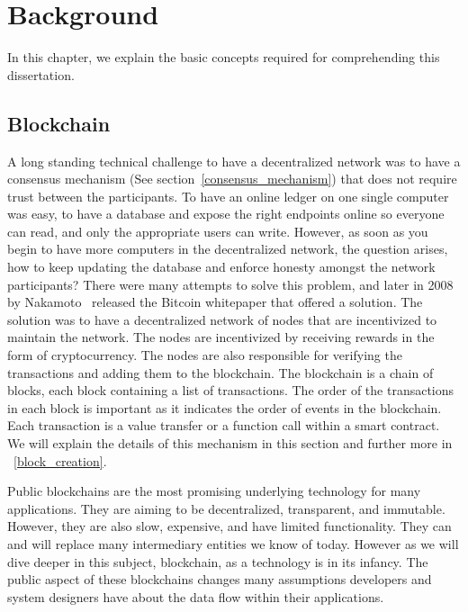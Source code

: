 


\chapter{Background} \label{sec:background}


In this chapter, we explain the basic concepts required for comprehending this dissertation.



\section{Blockchain}
A long standing technical challenge to have a decentralized network was to have a consensus mechanism (See section~\ref{consensus_mechanism}) that does not require trust between the participants. To have an online ledger on one single computer was easy, to have a database and expose the right endpoints online so everyone can read, and only the appropriate users can write. However, as soon as you begin to have more computers in the decentralized network, the question arises, how to keep updating the database and enforce honesty amongst the network participants? There were many attempts to solve this problem, and later in 2008 by Nakamoto~\cite{nakamoto2008bitcoin} released the Bitcoin whitepaper that offered a solution. The solution was to have a decentralized network of nodes that are incentivized to maintain the network. The nodes are incentivized by receiving rewards in the form of cryptocurrency. The nodes are also responsible for verifying the transactions and adding them to the blockchain. The blockchain is a chain of blocks, each block containing a list of transactions. The order of the transactions in each block is important as it indicates the order of events in the blockchain. Each transaction is a value transfer or a function call within a smart contract. We will explain the details of this mechanism in this section and further more in ~\ref{block_creation}.

Public blockchains are the most promising underlying technology for many applications. They are aiming to be decentralized, transparent, and immutable. However, they are also slow, expensive, and have limited functionality. They can and will replace many intermediary entities we know of today. However as we will dive deeper in this subject, blockchain, as a technology is in its infancy. The public aspect of these blockchains changes many assumptions developers and system designers have about the data flow within their applications. 


